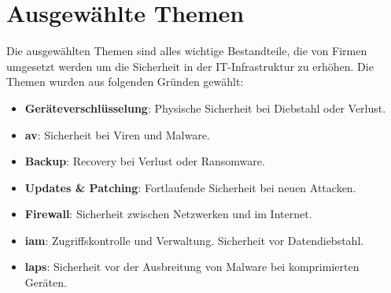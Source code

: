\section{Ausgewählte Themen}
Die ausgewählten Themen sind alles wichtige Bestandteile, die von Firmen umgesetzt werden um die Sicherheit in der IT-Infrastruktur zu erhöhen.
Die Themen wurden aus folgenden Gründen gewählt:

\begin{itemize}
    \item \textbf{Geräteverschlüsselung}: Physische Sicherheit bei Diebstahl oder Verlust.
    \item \textbf{\acrlong{av}}: Sicherheit bei Viren und Malware.
    \item \textbf{Backup}: Recovery bei Verlust oder Ransomware.
    \item \textbf{Updates \& Patching}: Fortlaufende Sicherheit bei neuen Attacken.
    \item \textbf{Firewall}: Sicherheit zwischen Netzwerken und im Internet.
    \item \textbf{\acrshort{iam}}: Zugriffskontrolle und Verwaltung. Sicherheit vor Datendiebstahl.
    \item \textbf{\acrshort{laps}}: Sicherheit vor der Ausbreitung von Malware bei komprimierten Geräten.
\end{itemize}